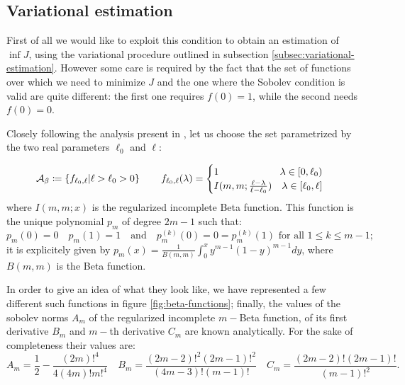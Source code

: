 \subsection{Variational estimation}
\label{subsec:V-optimization}

First of all we would like to exploit this condition to obtain an estimation of \(\inf J\), using the variational procedure outlined in subsection \ref{subsec:variational-estimation}. However some care is required by the fact that the set of functions over which we need to minimize \(J\) and the one where the Sobolev condition is valid are quite different: the first one requires \(f(0) = 1\), while the second needs \(f(0) = 0\).

Closely following the analysis present in \cite[]{fewster2020new}, let us choose the set parametrized by the two real parameters \(\ell_0\) and \(\ell\):

\[
\mathcal{A}_{\beta} \coloneqq \left\{f_{\ell_0, \ell} \vert \ell > \ell_0 >0\right\} \quad\quad f_{\ell_0, \ell}(\lambda) = 
\begin{cases}
	1 \hfill \lambda\in [0, \ell_0) \\
	I(m, m; \frac{\ell - \lambda}{\ell - \ell_0}) \quad \hfill \lambda\in [\ell_0, \ell]
\end{cases}
\]
where \(I(m,m;x)\) is the regularized incomplete Beta function. This function is the unique polynomial \(p_m\) of degree \(2m - 1\) such that:
\[
p_m(0) = 0 \quad p_m(1) = 1 \quad\text{and}\quad p^{(k)}_m(0) = 0 = p^{(k)}_m(1)	\text{ for all } 1 \le k \le m - 1;
\]
it is explicitely given by \(p_m(x) = \frac{1}{B(m, m)} \int_0^x y^{m - 1}(1 - y)^{m -1} dy\), where \(B(m,m)\) is the Beta function.

In order to give an idea of what they look like, we have represented a few different such functions in figure \ref{fig:beta-functions}; finally, the values of the sobolev norms \(A_m\) of the regularized incomplete \(m-\)Beta function, of its first derivative \(B_m\) and \(m-\)th derivative \(C_m\) are known analytically. For the sake of completeness their values are:
\[
A_m = \frac{1}{2} - \frac{(2m)!^4}{4(4m)!m!^4} \quad 
B_m= \frac{(2m-2)!^2(2m-1)!^2}{(4m-3)!(m - 1)!} \quad 
C_m = \frac{(2m-2)!(2m-1)!}{(m-1)!^2}. 
\]

